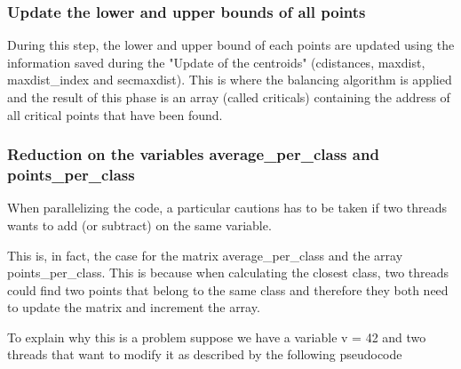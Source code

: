 \documentclass{report}
\begin{document}
\begin{minipage}[b]{0.48\textwidth}
  \subsubsection*{Update the lower and upper bounds of all points}
  During this step, the lower and upper bound of each points are updated using the information saved during the "Update of the centroids" (cdistances, maxdist, maxdist\_index and secmaxdist). This is where the balancing algorithm is applied and the result of this phase is an array (called criticals) containing the address of all critical points that have been found. 

  \subsubsection*{Reduction on the variables average\_per\_class and points\_per\_class}
  When parallelizing the code, a particular cautions has to be taken if two threads wants to add (or subtract) on the same variable.

  This is, in fact, the case for the matrix average\_per\_class and the array points\_per\_class. This is because when calculating the closest class, two threads could find two points that belong to the same class and therefore they both need to update the matrix and increment the array.

  To explain why this is a problem suppose we have a variable v = 42 and two threads that want to modify it as described by the following pseudocode
\end{minipage}
\hspace{0.1in}
\end{document}
